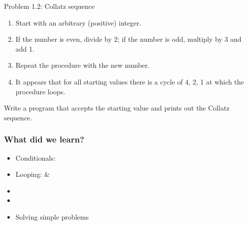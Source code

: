 \documentclass[14pt,compress]{beamer}
\begin{document}
\begin{frame}{Problem 1.2: Collatz sequence}
\begin{enumerate}
  \item Start with an arbitrary (positive) integer.
  \item If the number is even, divide by 2; if the number is odd, multiply by 3 and add 1.
  \item Repeat the procedure with the new number.
  \item It appears that for all starting values there is a cycle of 4, 2, 1 at which the procedure loops.
\end{enumerate}
    Write a program that accepts the starting value and prints out the Collatz sequence.
\end{frame}


\begin{frame}[fragile]
  \frametitle{What did we learn?}
  \begin{itemize}
    \item Conditionals: 
    \item Looping:  \& 
    \item {}
    \item {}
    \item Solving simple problems
  \end{itemize}
\end{frame}
\end{document}
